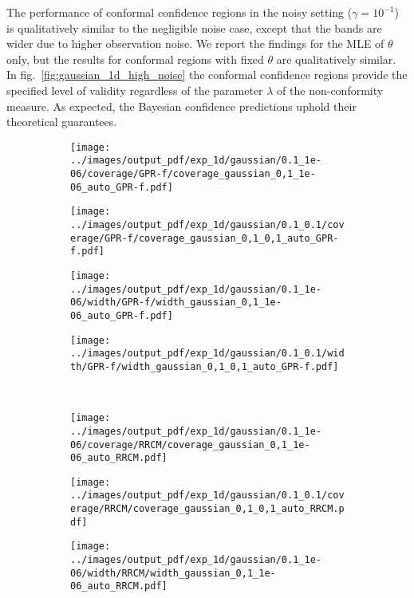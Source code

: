 \documentclass[10pt, conference, compsocconf]{IEEEtran}
\begin{document}
The performance of conformal confidence regions in the noisy setting ($\gamma=10^{-1}$)
is qualitatively similar to the negligible noise case, except that the bands are wider
due to higher observation noise. We report the findings for the MLE of $\theta$ only,
but the results for conformal regions with fixed $\theta$ are qualitatively similar.
In fig.~\ref{fig:gaussian_1d_high_noise} the conformal confidence regions provide the
specified level of validity regardless of the parameter $\lambda$ of the non-conformity
measure. As expected, the Bayesian confidence predictions uphold their theoretical
guarantees.

\begin{figure}%
  \centering
  \begin{subfigure}[b]{0.25\linewidth}
    \texttt{[image: ../images/output\_pdf/exp\_1d/gaussian/0.1\_1e-06/coverage/GPR-f/coverage\_gaussian\_0,1\_1e-06\_auto\_GPR-f.pdf]}
  \end{subfigure}%
  \begin{subfigure}[b]{0.25\linewidth}
    \texttt{[image: ../images/output\_pdf/exp\_1d/gaussian/0.1\_0.1/coverage/GPR-f/coverage\_gaussian\_0,1\_0,1\_auto\_GPR-f.pdf]}
  \end{subfigure}%
    \begin{subfigure}[b]{0.25\linewidth}
    \texttt{[image: ../images/output\_pdf/exp\_1d/gaussian/0.1\_1e-06/width/GPR-f/width\_gaussian\_0,1\_1e-06\_auto\_GPR-f.pdf]}
  \end{subfigure}%
  \begin{subfigure}[b]{0.25\linewidth}
    \texttt{[image: ../images/output\_pdf/exp\_1d/gaussian/0.1\_0.1/width/GPR-f/width\_gaussian\_0,1\_0,1\_auto\_GPR-f.pdf]}
  \end{subfigure}\\
  \begin{subfigure}[b]{0.25\linewidth}
    \texttt{[image: ../images/output\_pdf/exp\_1d/gaussian/0.1\_1e-06/coverage/RRCM/coverage\_gaussian\_0,1\_1e-06\_auto\_RRCM.pdf]}
  \end{subfigure}%
  \begin{subfigure}[b]{0.25\linewidth}
    \texttt{[image: ../images/output\_pdf/exp\_1d/gaussian/0.1\_0.1/coverage/RRCM/coverage\_gaussian\_0,1\_0,1\_auto\_RRCM.pdf]}
  \end{subfigure}%
  \begin{subfigure}[b]{0.25\linewidth}
    \texttt{[image: ../images/output\_pdf/exp\_1d/gaussian/0.1\_1e-06/width/RRCM/width\_gaussian\_0,1\_1e-06\_auto\_RRCM.pdf]}

\end{subfigure}
\end{figure}
\end{document}
